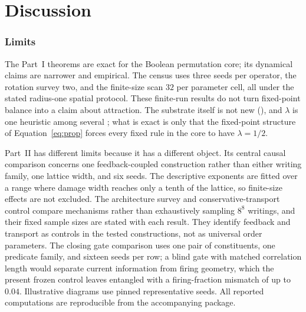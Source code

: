 \documentclass[man,12pt,floatsintext,donotrepeattitle]{apa7}
\newcommand{\secref}[1]{\emph{\nameref{#1}}}
\begin{document}


\part*{Discussion}
\label{part:discussion}

\section{Limits}
\label{sec:limits}

The Part~I theorems are exact for the Boolean permutation core; its dynamical
claims are narrower and empirical. The census uses three seeds per operator,
the rotation survey two, and the finite-size scan $32$ per parameter cell, all
under the stated radius-one spatial protocol. These finite-run results do not
turn fixed-point balance into a claim about attraction. The substrate itself is
not new (\secref{sec:object}), and $\lambda$ is one heuristic among several
\parencite{wuensche1999classifying}; what is exact is only that the fixed-point
structure of Equation~\eqref{eq:prop} forces every fixed rule in the core to
have $\lambda=1/2$.

Part~II has different limits because it has a different object. Its central
causal comparison concerns one feedback-coupled construction rather than
either writing family, one lattice width, and six seeds. The descriptive
exponents are fitted over a range where damage width reaches only a tenth of
the lattice, so finite-size effects are not excluded. The architecture survey
and conservative-transport control compare mechanisms rather than exhaustively
sampling $8^8$ writings, and their fixed sample sizes are stated with each
result. They identify feedback and transport as controls in the tested
constructions, not as universal order parameters. The closing gate comparison uses one pair of constituents, one predicate
family, and sixteen seeds per row; a blind gate with matched correlation
length would separate current information from firing geometry, which the
present frozen control leaves entangled with a firing-fraction mismatch of up
to $0.04$. Illustrative diagrams use
pinned representative seeds. All reported computations are reproducible from
the accompanying package.
\end{document}

